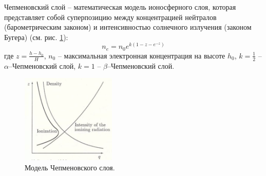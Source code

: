 Чепменовский слой -- математическая модель ионосферного слоя, которая представляет собой суперпозицию между концентрацией нейтралов (барометрическим законом) и интенсивностью солнечного излучения (законом Бугера) (см. рис. \ref{fig:chap}):
\begin{equation}
n_e=n_0 e^{k\left(1-z-e^{-z}\right)}
\end{equation}
где $z=\frac{h-h_0}{H}$, $n_0$ -- максимальная электронная концентрация на высоте $h_0$, $k=\frac{1}{2}$ -- $\alpha$--Чепменовский слой, $k=1$ -- $\beta$--Чепменовский слой.

\begin{figure}[!ht]
\centering
\includegraphics[width=0.4\textwidth]{images/chap.png}
\caption{Модель Чепменовского слоя.}\label{fig:chap}
\end{figure}
